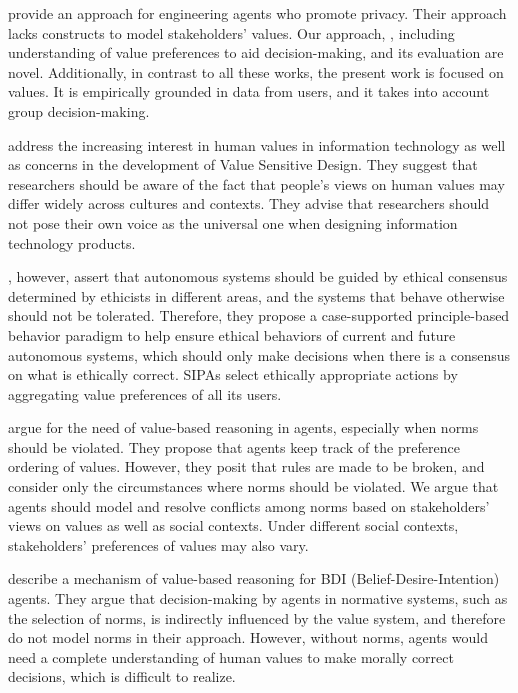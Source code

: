 \citet{Ajmeri-AAMAS17-Arnor} provide an approach for engineering agents who promote privacy. Their approach lacks constructs to model stakeholders' values. Our approach, \frameworkAinur, including understanding of value preferences to aid decision-making, and its evaluation are novel.
% 
Additionally, in contrast to all these works, the present work is focused on values. It is empirically grounded in data from users, and it takes into account group decision-making.

\citet{Borning-CHI2012-VSD} address the increasing interest in human values in information technology as well as concerns in the development of Value Sensitive Design. They suggest that researchers should be aware of the fact that people's views on human values may differ widely across cultures and contexts. They advise that researchers should not pose their own voice as the universal one when designing information technology products. 

\citet{anderson-2015-ethical}, however, assert that autonomous systems should be guided by ethical consensus determined by ethicists in different areas, and the systems that behave otherwise should not be tolerated. Therefore, they propose a case-supported principle-based behavior paradigm to help ensure ethical behaviors of current and future autonomous systems, which should only make decisions when there is a consensus on what is ethically correct. \frameworkAinur SIPAs select ethically appropriate actions by aggregating value preferences of all its users.

\citet{Bench-Capon-ail2017} argue for the need of value-based reasoning in agents, especially when norms should be violated. They propose that agents keep track of the preference ordering of values. However, they posit that rules are made to be broken, and consider only the circumstances where norms should be violated. We argue that agents should model and resolve conflicts among norms based on stakeholders' views on values as well as social contexts. Under different social contexts, stakeholders' preferences of values may also vary. 

\citet{Cranefield-ijcai17-value+bdi} describe a mechanism of value-based reasoning for BDI (Belief-Desire-Intention) agents. They argue that decision-making by agents in normative systems, such as the selection of norms, is indirectly influenced by the value system, and therefore do not model norms in their approach. 
However, without norms, agents would need a complete understanding of human values to make morally correct decisions, which is difficult to realize. 

